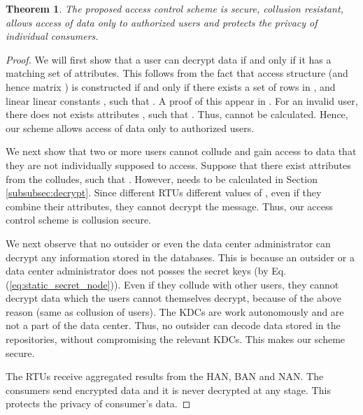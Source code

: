 \documentclass[conference]{IEEEtran}[10pt]
\newtheorem{theorem}{Theorem}
\begin{document}
\begin{theorem}
The proposed access control scheme is secure, collusion resistant, allows access of data only to authorized users and protects the privacy of 
individual consumers.
\end{theorem}

\begin{proof}
We will first show that a user can decrypt data  if and only if it has a matching set of attributes. 
This follows from the fact that access structure  (and hence matrix ) is constructed 
if and only if
there exists a set of rows  in , and linear linear constants , such that .  
A proof of this appear in \cite[Chapter 4]{B96}.
For an invalid user, there does not exists attributes , such that  
. 
Thus,  cannot be calculated. 
Hence, our scheme allows access of data only to authorized users. 

We next show that two or more users cannot collude and gain access to data that they are not individually supposed to access. 
Suppose that there exist attributes  from the colludes, such that . 
However,  needs to be calculated 
in Section \ref{subsubsec:decrypt}.
Since different RTUs different values of , 
even if they combine their attributes, 
they cannot decrypt the message. 
Thus, our access control scheme is collusion secure.


We next observe that no outsider or even the data center administrator can decrypt any information stored in the databases. 
This is because an outsider or a data center administrator  does not posses the secret keys  (by Eq.(\ref{eq:static_secret_node})). 
Even if they collude with other users, they cannot decrypt data which the users cannot themselves decrypt, because of the
above reason (same as collusion of users).  
The KDCs are work autonomously and are not a part of the data center. 
Thus, no outsider can decode data stored in the repositories, without compromising the relevant KDCs.  
This makes our scheme secure. 

The RTUs receive aggregated results from the HAN, BAN and NAN. 
The consumers send encrypted data and it is never decrypted at any stage. 
This protects the privacy of consumer's data. 


\end{proof}
\end{document}
